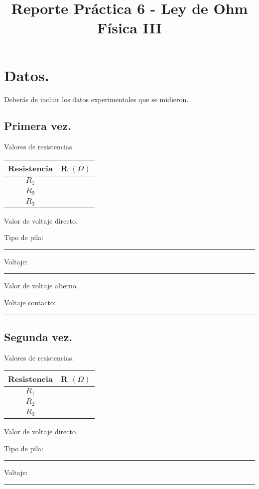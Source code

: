 \documentclass[14pt]{extarticle}
\title{\vspace*{-2cm} Reporte Práctica 6 - Ley de Ohm\\  Física III \vspace{-5ex}}
\date{}
\begin{document}
\maketitle

\section{Datos.}

Deberás de incluir los datos experimentales que se midieron.

\subsection{Primera vez.}

Valores de resistencias.
\begin{table}[H]
\centering
\begin{tabular}{| c | c | } \hline
Resistencia & R $(\Omega)$ \\ \hline
$R_{1}$ & \\ \hline
$R_{2}$ & \\ \hline
$R_{3}$ & \\ \hline
\end{tabular}
\end{table}

Valor de voltaje directo.

Tipo de pila: \rule{2cm}{0.1mm} Voltaje: \rule{2cm}{0.1mm}

Valor de voltaje alterno.

Voltaje contacto: \rule{2cm}{0.1mm}

\subsection{Segunda vez.}

Valores de resistencias.
\begin{table}[H]
\centering
\begin{tabular}{| c | c | } \hline
Resistencia & R $(\Omega)$ \\ \hline
$R_{1}$ & \\ \hline
$R_{2}$ & \\ \hline
$R_{3}$ & \\ \hline
\end{tabular}
\end{table}

Valor de voltaje directo.

Tipo de pila: \rule{2cm}{0.1mm} Voltaje: \rule{2cm}{0.1mm}
\end{document}
